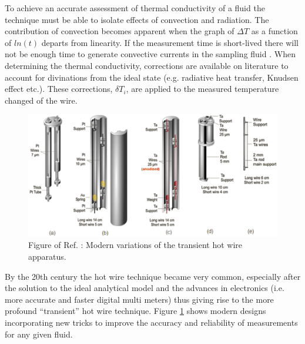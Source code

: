 \documentclass[12pt,MEng]{UoAThesis}
\begin{document}
To achieve an accurate assessment of thermal conductivity of a fluid the technique must be able to isolate effects of convection and radiation. The contribution of convection becomes apparent when the graph of $\Delta T$ as a function of $ln(t)$ departs from linearity. If the measurement time is short-lived there will not be enough time to generate convective currents in the sampling fluid \cite{groot}. When determining the thermal conductivity, corrections are available on literature to account for divinations from the ideal state (e.g. radiative heat transfer, Knudsen effect etc.). These corrections, $\delta T_i$, are applied to the measured temperature changed of the wire.


\begin{figure}[htp]
  \centering
  \includegraphics[clip,width=1\linewidth]{figures/newTHW}
  \caption{\label{fig:newthw} Figure of Ref. \cite{history}: Modern variations of the transient hot wire apparatus.}
\end{figure}

By the 20th century the hot wire technique became very common, especially after the solution to the ideal analytical model and the advances in electronics (i.e. more accurate and faster digital multi meters) thus giving rise to the more profound ``transient'' hot wire technique. Figure \ref{fig:newthw} shows modern designs incorporating new tricks to improve the accuracy and reliability of measurements for any given fluid. 
\end{document}
